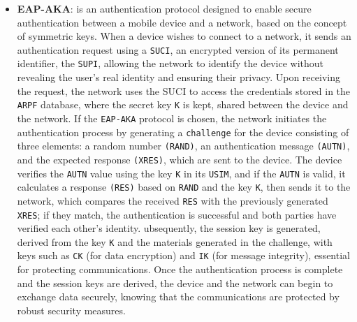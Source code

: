 \documentclass[english]{article}
\begin{document}
\begin{itemize}
	\item \textbf{\hypertarget{EAP-AKA}{EAP-AKA}}:
	      is an authentication protocol designed to enable secure authentication between a mobile device
	      and a network, based on the concept of symmetric keys. When a device wishes to connect to a network,
	      it sends an authentication request using a \texttt{SUCI}, an encrypted version of its permanent
	      identifier, the \texttt{SUPI}, allowing the network to identify the device without revealing
	      the user’s real identity and ensuring their privacy. Upon receiving the request, the network
	      uses the SUCI to access the credentials stored in the \texttt{ARPF} database, where the secret
	      key \texttt{K} is kept, shared between the device and the network. If the \texttt{EAP-AKA}
	      protocol is chosen, the network initiates the authentication process by generating a
	      \texttt{challenge} for the device consisting of three elements: a random number
	      \texttt{(RAND)}, an authentication message \texttt{(AUTN)}, and the expected response
	      \texttt{(XRES)}, which are sent to the device. The device verifies the \texttt{AUTN} value using
	      the key \texttt{K} in its \texttt{USIM}, and if the \texttt{AUTN} is valid, it calculates a
	      response \texttt{(RES)} based on \texttt{RAND} and the key \texttt{K}, then sends it to the network,
	      which compares the received \texttt{RES} with the previously generated \texttt{XRES}; if they match,
	      the authentication is successful and both parties have verified each other's identity.
	      ubsequently, the session key is generated, derived from the key \texttt{K} and the materials
	      generated in the challenge, with keys such as \texttt{CK} (for data encryption) and
	      \texttt{IK} (for message integrity), essential for protecting communications.
	      Once the authentication process is complete and the session keys are derived, the device and
	      the network can begin to exchange data securely, knowing that the communications are protected
	      by robust security measures.

\end{itemize}
\end{document}
